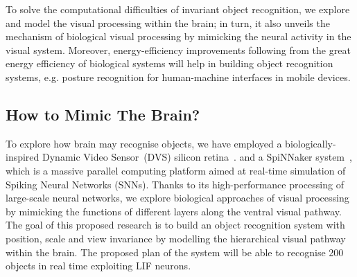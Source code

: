 \documentclass[journal]{journal}
\begin{document}
To solve the computational difficulties of invariant object recognition, we explore and model the visual processing within the brain;
in turn, it also unveils the mechanism of biological visual processing by mimicking the neural activity in the visual system. 
Moreover, energy-efficiency improvements following from the great energy efficiency of biological systems will help in building object recognition systems, e.g. posture recognition for human-machine interfaces in mobile devices.

\subsection{How to Mimic The Brain?}
\label{sec:brn}
To explore how brain may recognise objects, we have employed a biologically-inspired  Dynamic Video Sensor~(DVS) silicon retina~\cite{lenero20113}.
and a SpiNNaker system~\cite{furber2014spinnaker}, which is a massive parallel computing platform aimed at real-time simulation of Spiking Neural Networks (SNNs). 
Thanks to its high-performance processing of large-scale neural networks, we explore biological approaches of visual processing by mimicking the functions of different layers along the ventral visual pathway.
The goal of this proposed research is to build an object recognition system with position, scale and view invariance by modelling the hierarchical visual pathway within the brain.
The proposed plan of the system will be able to recognise 200 objects in real time exploiting LIF neurons.
\end{document}
